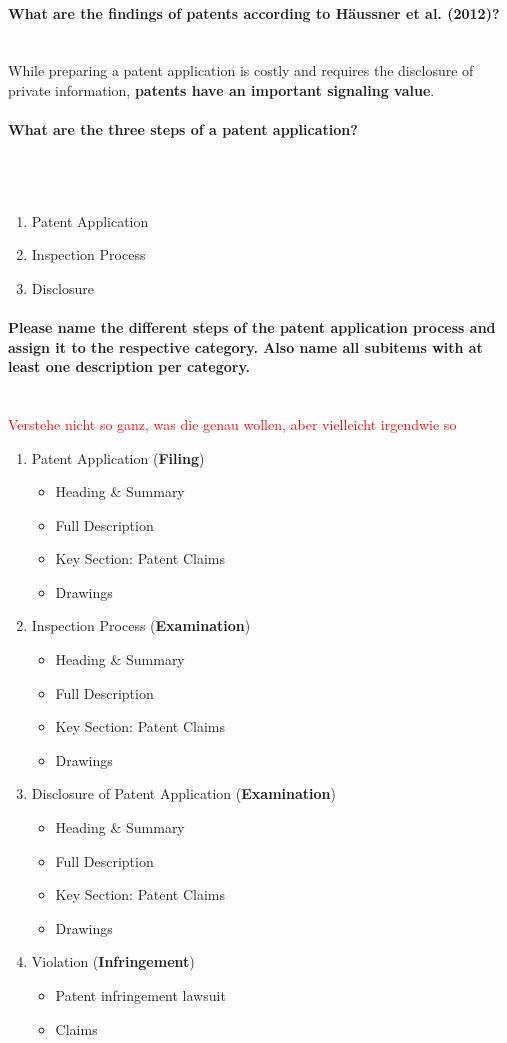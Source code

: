 \documentclass[10pt,a4paper,noendnumber=true]{scrartcl}
\newcommand{\properparagraph}[1]{\paragraph{\textcolor{Emerald}{#1}}\mbox{}\\}
\begin{document}
\properparagraph{What are the findings of patents according to Häussner et al. (2012)?}
While preparing a patent application is costly and requires the disclosure of private information, \textbf{patents have an important signaling value}.

\properparagraph{What are the three steps of a patent application?}
\\[-6ex]
\begin{enumerate}
	\item Patent Application
	\item Inspection Process
	\item Disclosure
\end{enumerate}
	
\properparagraph{Please name the different steps of the patent application process and assign it to the respective category. Also name all subitems with at least one description per category.}
\textcolor{red}{Verstehe nicht so ganz, was die genau wollen, aber vielleicht irgendwie so}
\begin{enumerate}
	\item Patent Application (\textbf{Filing})
		\begin{itemize}
			\item Heading \& Summary
			\item Full Description
			\item Key Section: Patent Claims
			\item Drawings
		\end{itemize}
	\item Inspection Process (\textbf{Examination})
		\begin{itemize}
			\item Heading \& Summary
			\item Full Description
			\item Key Section: Patent Claims
			\item Drawings
		\end{itemize}
	\item Disclosure of Patent Application (\textbf{Examination})
		\begin{itemize}
			\item Heading \& Summary
			\item Full Description
			\item Key Section: Patent Claims
			\item Drawings
		\end{itemize}
	\item Violation (\textbf{Infringement})
		\begin{itemize}
			\item Patent infringement lawsuit
			\item Claims
		\end{itemize}
\end{enumerate}
\end{document}
